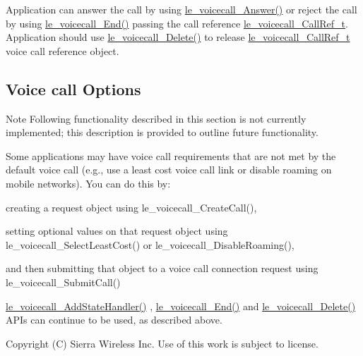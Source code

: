 Application can answer the call by using \hyperlink{le__voicecall__interface_8h_a9dc899a059b3881edb7da244b8c9fbef}{le\+\_\+voicecall\+\_\+\+Answer()} or reject the call by using \hyperlink{le__voicecall__interface_8h_aa4758e37f80ef9fd410ef0a9731d3797}{le\+\_\+voicecall\+\_\+\+End()} passing the call reference \hyperlink{le__voicecall__interface_8h_a74c8b6a9f13f7a8ef47b6b1d57d8ab56}{le\+\_\+voicecall\+\_\+\+Call\+Ref\+\_\+t}. Application should use \hyperlink{le__voicecall__interface_8h_adb9eeb5c2e344f72b934dc8b72d3db62}{le\+\_\+voicecall\+\_\+\+Delete()} to release \hyperlink{le__voicecall__interface_8h_a74c8b6a9f13f7a8ef47b6b1d57d8ab56}{le\+\_\+voicecall\+\_\+\+Call\+Ref\+\_\+t} voice call reference object.\hypertarget{c_le_voicecall_c_le_voicecall_options}{}\subsection{Voice call Options}\label{c_le_voicecall_c_le_voicecall_options}
\begin{DoxyNote}{Note}
Following functionality described in this section is not currently implemented; this description is provided to outline future functionality.
\end{DoxyNote}
Some applications may have voice call requirements that are not met by the default voice call (e.\+g., use a least cost voice call link or disable roaming on mobile networks). You can do this by\+:
\begin{DoxyItemize}
\item creating a request object using le\+\_\+voicecall\+\_\+\+Create\+Call(),
\item setting optional values on that request object using le\+\_\+voicecall\+\_\+\+Select\+Least\+Cost() or le\+\_\+voicecall\+\_\+\+Disable\+Roaming(),
\item and then submitting that object to a voice call connection request using le\+\_\+voicecall\+\_\+\+Submit\+Call()
\end{DoxyItemize}

\hyperlink{le__voicecall__interface_8h_a54875833715ef1f81d78d74cb86d0562}{le\+\_\+voicecall\+\_\+\+Add\+State\+Handler()} , \hyperlink{le__voicecall__interface_8h_aa4758e37f80ef9fd410ef0a9731d3797}{le\+\_\+voicecall\+\_\+\+End()} and \hyperlink{le__voicecall__interface_8h_adb9eeb5c2e344f72b934dc8b72d3db62}{le\+\_\+voicecall\+\_\+\+Delete()} A\+P\+Is can continue to be used, as described above.





Copyright (C) Sierra Wireless Inc. Use of this work is subject to license. 